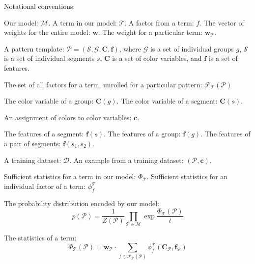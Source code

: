 
\newcommand{\pattern}{\mathcal{P}}
\newcommand{\group}{g}
\newcommand{\groups}{\mathcal{G}}
\newcommand{\segment}{s}
\newcommand{\segments}{\mathcal{S}}
\newcommand{\model}{\mathcal{M}}
\newcommand{\term}{\mathcal{T}}
\newcommand{\factor}{f}
\newcommand{\factors}{\mathcal{F}_\term}
\newcommand{\weights}{\mathbf{w}}
\newcommand{\dataset}{\mathcal{D}}
\newcommand{\variable}[1]{\mathbf{#1}}
\newcommand{\colorVars}{\variable{C}}
\newcommand{\colors}{\variable{c}}
\newcommand{\features}{\variable{f}}
\newcommand{\termStats}{\Phi_\term}
\newcommand{\factorStats}{\phi^\term_\factor}
\newcommand{\expectation}{\mathds{E}}

Notational conventions:

Our model: $\model$. A term in our model: $\term$. A factor from a term: $\factor$. The vector of weights for the entire model: $\weights$. The weight for a particular term: $\weights_\term$.

A pattern template: $\pattern = (\segments, \groups, \colorVars, \features)$, where $\groups$ is a set of individual groups $\group$, $\segments$ is a set of individual segments $\segment$, $\colorVars$ is a set of color variables, and $\features$ is a set of features.

The set of all factors for a term, unrolled for a particular pattern: $\factors(\pattern)$

The color variable of a group: $\colorVars(\group)$. The color variable of a segment: $\colorVars(\segment)$.

An assignment of colors to color variables: $\colors$.

The features of a segment: $\features(\segment)$. The features of a group: $\features(\group)$. The features of a pair of segments: $\features(\segment_1, \segment_2)$.

A training dataset: $\dataset$. An example from a training dataset: $(\pattern, \colors)$.

Sufficient statistics for a term in our model: $\termStats$. Sufficient statistics for an individual factor of a term: $\factorStats$

The probability distribution encoded by our model:
\begin{equation*}
p(\pattern) = \frac{1}{Z(\pattern)} \prod_{\term \in \model} \exp{\frac{\termStats(\pattern)}{t}}
\end{equation*}

The statistics of a term:
\begin{equation*}
\termStats(\pattern) = \weights_\term \cdot \sum_{\factor \in \factors(\pattern)} \factorStats(\colorVars_\pattern, \features_\pattern)
\end{equation*}
